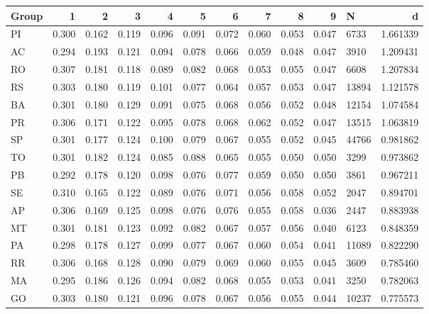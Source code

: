 \begin{tabular}{lrrrrrrrrrlr}
\toprule
Group &      1 &      2 &      3 &      4 &      5 &      6 &      7 &      8 &      9 &      N &         d \\
\midrule
   PI &  0.300 &  0.162 &  0.119 &  0.096 &  0.091 &  0.072 &  0.060 &  0.053 &  0.047 &   6733 &  1.661339 \\
   AC &  0.294 &  0.193 &  0.121 &  0.094 &  0.078 &  0.066 &  0.059 &  0.048 &  0.047 &   3910 &  1.209431 \\
   RO &  0.307 &  0.181 &  0.118 &  0.089 &  0.082 &  0.068 &  0.053 &  0.055 &  0.047 &   6608 &  1.207834 \\
   RS &  0.303 &  0.180 &  0.119 &  0.101 &  0.077 &  0.064 &  0.057 &  0.053 &  0.047 &  13894 &  1.121578 \\
   BA &  0.301 &  0.180 &  0.129 &  0.091 &  0.075 &  0.068 &  0.056 &  0.052 &  0.048 &  12154 &  1.074584 \\
   PR &  0.306 &  0.171 &  0.122 &  0.095 &  0.078 &  0.068 &  0.062 &  0.052 &  0.047 &  13515 &  1.063819 \\
   SP &  0.301 &  0.177 &  0.124 &  0.100 &  0.079 &  0.067 &  0.055 &  0.052 &  0.045 &  44766 &  0.981862 \\
   TO &  0.301 &  0.182 &  0.124 &  0.085 &  0.088 &  0.065 &  0.055 &  0.050 &  0.050 &   3299 &  0.973862 \\
   PB &  0.292 &  0.178 &  0.120 &  0.098 &  0.076 &  0.077 &  0.059 &  0.050 &  0.050 &   3861 &  0.967211 \\
   SE &  0.310 &  0.165 &  0.122 &  0.089 &  0.076 &  0.071 &  0.056 &  0.058 &  0.052 &   2047 &  0.894701 \\
   AP &  0.306 &  0.169 &  0.125 &  0.098 &  0.076 &  0.076 &  0.055 &  0.058 &  0.036 &   2447 &  0.883938 \\
   MT &  0.301 &  0.181 &  0.123 &  0.092 &  0.082 &  0.067 &  0.057 &  0.056 &  0.040 &   6123 &  0.848359 \\
   PA &  0.298 &  0.178 &  0.127 &  0.099 &  0.077 &  0.067 &  0.060 &  0.054 &  0.041 &  11089 &  0.822290 \\
   RR &  0.306 &  0.168 &  0.128 &  0.090 &  0.079 &  0.069 &  0.060 &  0.055 &  0.045 &   3609 &  0.785460 \\
   MA &  0.295 &  0.186 &  0.126 &  0.094 &  0.082 &  0.068 &  0.055 &  0.053 &  0.041 &   3250 &  0.782063 \\
   GO &  0.303 &  0.180 &  0.121 &  0.096 &  0.078 &  0.067 &  0.056 &  0.055 &  0.044 &  10237 &  0.775573 \\

\end{tabular}
